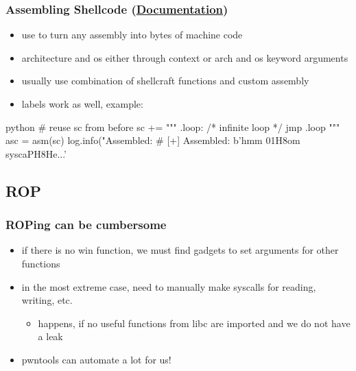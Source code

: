 \documentclass[aspectratio=169]{beamer}
\newcommand{\docl}[1]{(\textbf{\href{#1}{Documentation}})}
\begin{document}
{\begin{frame}[fragile]
    \frametitle{Assembling Shellcode \docl{http://docs.pwntools.com/en/stable/asm.html}}
    \begin{itemize}
        \item use  to turn any assembly into bytes of machine code
        \item architecture and os either through context or arch and os keyword arguments
        \item usually use combination of shellcraft functions and custom assembly
        \item labels work as well, example:
    \end{itemize}
    \begin{codebox}{python}
# reuse sc from before
sc += """
.loop: /* infinite loop */
    jmp .loop 
"""
asc = asm(sc)
log.info("Assembled: %
# [+] Assembled: b'hmm \x01H\xb8om syscaPH\xb8He...'\end{codebox}
\end{frame}

\subsection{ROP}
\begin{frame}
    \frametitle{ROPing can be cumbersome}
    \begin{itemize}
        \item if there is no win function, we must find gadgets to set arguments for other functions
        \item in the most extreme case, need to manually make syscalls for reading, writing, etc.
        \begin{itemize}
            \item happens, if no useful functions from libc are imported and we do not have a leak
        \end{itemize}
        \item pwntools can automate a lot for us!
    \end{itemize}
\end{frame}

}
\end{document}
